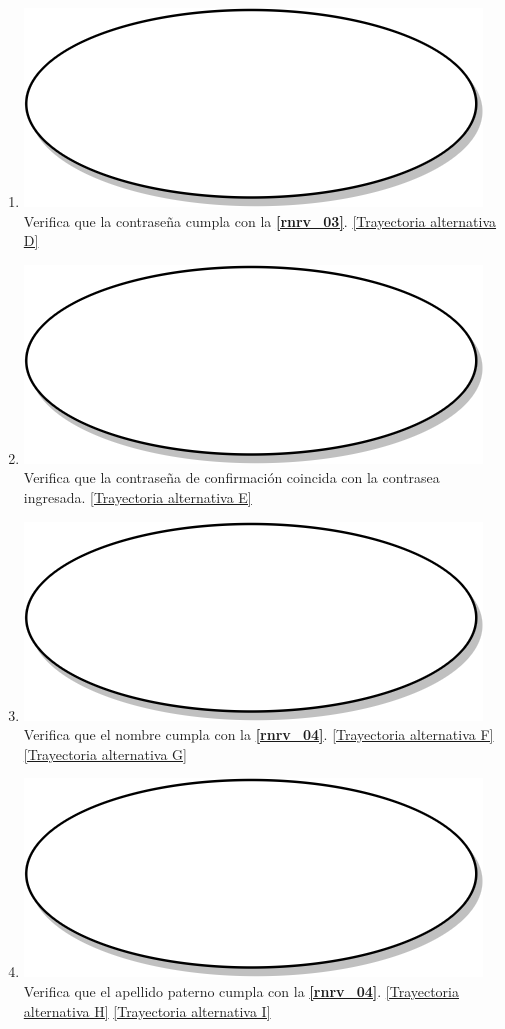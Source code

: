 \begin{enumerate}
  \item {\includegraphics[scale=.05]{Capitulo3/img/proceso.png} Verifica que la contraseña cumpla con la \textbf{\ref{rnrv_03}}. \hyperref[cu2_ta_d]{[Trayectoria alternativa D]}}
  \item {\includegraphics[scale=.05]{Capitulo3/img/proceso.png} Verifica que la contraseña de confirmación coincida con la contrasea ingresada. \hyperref[cu2_ta_e]{[Trayectoria alternativa E]}}
  \item {\includegraphics[scale=.05]{Capitulo3/img/proceso.png} Verifica que el nombre cumpla con la \textbf{\ref{rnrv_04}}. \hyperref[cu2_ta_f]{[Trayectoria alternativa F]} \hyperref[cu2_ta_g]{[Trayectoria alternativa G]}}
  \item {\includegraphics[scale=.05]{Capitulo3/img/proceso.png} Verifica que el apellido paterno cumpla con la \textbf{\ref{rnrv_04}}. \hyperref[cu2_ta_h]{[Trayectoria alternativa H]} \hyperref[cu2_ta_i]{[Trayectoria alternativa I]}}

\end{enumerate}
